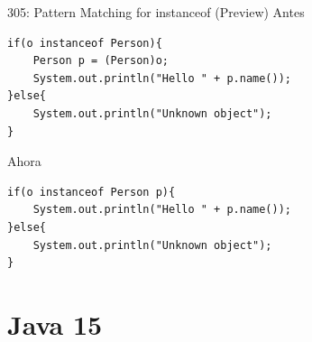 \documentclass[aspectratio=169]{beamer}
\begin{document}
\begin{frame}[fragile]{305:	Pattern Matching for instanceof (Preview)}
Antes
\begin{lstlisting}
if(o instanceof Person){
    Person p = (Person)o;
    System.out.println("Hello " + p.name());
}else{
    System.out.println("Unknown object");
}
\end{lstlisting}	

Ahora
\begin{lstlisting}
if(o instanceof Person p){
    System.out.println("Hello " + p.name());
}else{
    System.out.println("Unknown object");
}
\end{lstlisting}	
\end{frame}

{
    \section{Java 15}
}
\end{document}
